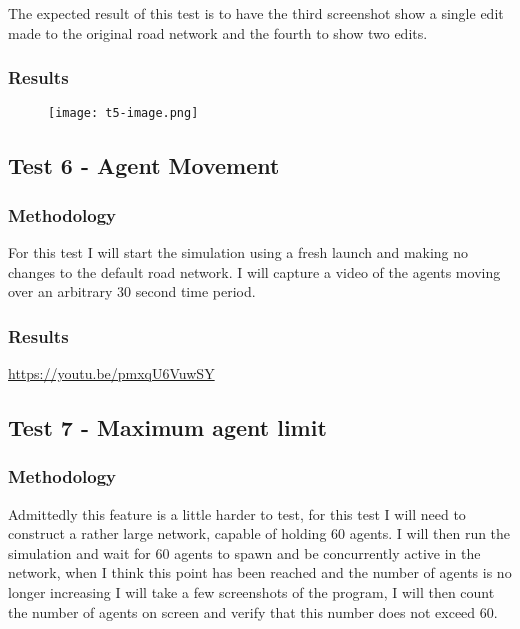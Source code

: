             The expected result of this test is to have the third screenshot show a single edit made to the original road network and the fourth to show two edits.

        \subsubsection{Results}

            \begin{figure}[ht]
                \centering
                \texttt{[image: t5-image.png]}
                \caption{}
                \label{testing:t5-image}
            \end{figure}

    \subsection{Test 6 - Agent Movement}

        \subsubsection{Methodology}

            For this test I will start the simulation using a fresh launch and making no changes to the default road network. I will capture a video of the agents moving over an arbitrary 30 second time period.

        \subsubsection{Results}

            \href{https://youtu.be/pmxqU6VuwSY}{https://youtu.be/pmxqU6VuwSY}

    \subsection{Test 7 - Maximum agent limit}

        \subsubsection{Methodology}

            Admittedly this feature is a little harder to test, for this test I will need to construct a rather large network, capable of holding 60 agents. I will then run the simulation and wait for 60 agents to spawn and be concurrently active in the network, when I think this point has been reached and the number of agents is no longer increasing I will take a few screenshots of the program, I will then count the number of agents on screen and verify that this number does not exceed 60.

